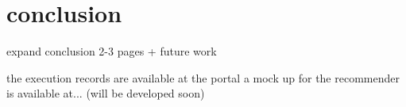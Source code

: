 \chapter{conclusion}
\label{conclusion}


expand conclusion 2-3 pages + future work

the execution records are available at the portal
a mock up for the recommender is available at... (will be developed soon)